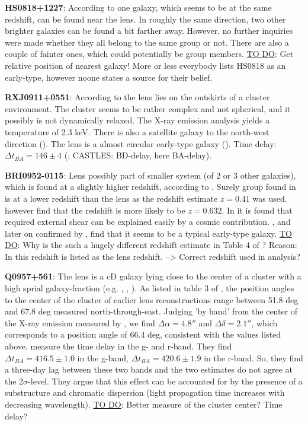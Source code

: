 \documentclass[10pt]{article}
\begin{document}
\textbf{HS0818+1227}: According to \cite{2000A&A...357L..29H} one galaxy, which seems to be at the same redshift, can be found near the lens. In roughly the same direction, two other brighter galaxies can be found a bit farther away. However, no further inquiries were made whether they all belong to the same group or not. There are also a couple of fainter ones, which could potentially be group members. \underline{TO DO}: Get relative position of nearest galaxy! More or less everybody lists HS0818 as an early-type, however noone states a source for their belief.

\textbf{RXJ0911+0551}: According to \cite{2001ApJ...555....1M} the lens lies on the outskirts of a cluster environment. The cluster seems to be rather complex and not spherical, and it possibly is not dynamically relaxed. The X-ray emission analysis yields a temperature of 2.3 keV. There is also a satellite galaxy to the north-west direction (\cite{2000ApJ...544L..35K}). The lens is a almost circular early-type galaxy (\cite{2012A&A...538A..99S}). Time delay: $\Delta t_{BA}=146\pm4$ (\cite{2002ApJ...572L..11H}; CASTLES: BD-delay, here BA-delay).

\textbf{BRI0952-0115}: Lens possibly part of smaller system (of 2 or 3 other galaxies), which is found at a slightly higher redshift, according to \cite{2007A&A...465...51E}. Surely group found in \cite{2006ApJ...641..169M} is at a lower redshift than the lens as the redshift estimate $z=0.41$ was used. \cite{2007A&A...465...51E} however find that the redshift is more likely to be $z=0.632$. In \cite{2000ApJ...536..584L} it is found that required external shear can be explained easily by a cosmic contribution. \cite{2000ApJ...536..584L}, and later on confirmed by \cite{2007A&A...465...51E}, find that it seems to be a typical early-type galaxy. \underline{TO DO}: Why is the such a hugely different redshift estimate in Table 4 of \cite{2006ApJ...641..169M}? Reason: In \cite{2000ApJ...536..584L} this redshift is listed as the lens redshift. --> Correct redshift used in analysis?

\textbf{Q0957+561}: The lens is a cD galaxy lying close to the center of a cluster with a high sprial galaxy-fraction (e.g. \cite{1992MNRAS.254P..27G}, \cite{1994A&A...291..411A}, \cite{1998ApJ...504..661C}). As listed in table 3 of \cite{2000ApJ...542...74K}, the position angles to the center of the cluster of earlier lens reconstructions range between 51.8 deg and 67.8 deg measured north-through-east. Judging 'by hand' from the center of the X-ray emission measured by \cite{1998ApJ...504..661C}, we find $\Delta\alpha=4.8''$ and $\Delta\delta=2.1''$, which corresponds to a position angle of 66.4 deg, consistent with the values listed above. \cite{2012A&A...540A.132S} measure the time delay in the g- and r-band. They find $\Delta t_{BA}=416.5\pm1.0$ in the g-band, $\Delta t_{BA}=420.6\pm1.9$ in the r-band. So, they find a three-day lag between these two bands and the two estimates do not agree at the 2$\sigma$-level. They argue that this effect can be accounted for by the presence of a substructure and chromatic dispersion (light propagation time increases with decreasing wavelength). \underline{TO DO}: Better measure of the cluster center? Time delay?
\end{document}
